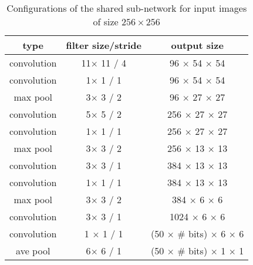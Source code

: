 \documentclass[10pt,twocolumn,letterpaper]{article}
\begin{document}
\begin{table}[t]
    \centering \caption{Configurations of the shared sub-network for input images of size $256\times 256$}
    \begin{tabular}{|c|c | c |}
        \hline{\bf type} &  {\bf filter size/stride} & {\bf output size} \\
        \hline
         convolution & 11$\times$ 11 / 4 & 96 $\times$ 54 $\times$ 54 \\
         \hline
         convolution &1$\times$ 1 / 1  & 96 $\times$ 54 $\times$ 54 \\
         \hline
         max pool & 3$\times$ 3 / 2  &96 $\times$ 27 $\times$ 27 \\
         \hline
         convolution & 5$\times$ 5 / 2  & 256 $\times$ 27 $\times$ 27 \\
         \hline
         convolution & 1$\times$ 1 / 1 & 256 $\times$ 27 $\times$ 27 \\
         \hline
         max pool & 3$\times$ 3 / 2 & 256 $\times$ 13 $\times$ 13 \\
         \hline
         convolution & 3$\times$ 3 / 1  & 384 $\times$ 13 $\times$ 13 \\
         \hline
         convolution & 1$\times$ 1 / 1 & 384 $\times$ 13 $\times$ 13 \\
         \hline
         max pool & 3$\times$ 3 / 2 & 384 $\times$ 6 $\times$ 6 \\
         \hline
         convolution & 3$\times$ 3 / 1   & 1024 $\times$ 6 $\times$ 6 \\
         \hline
         convolution & 1 $\times$ 1 / 1 & (50 $\times$ \# bits) $\times$ 6 $\times$ 6 \\
         \hline
         ave pool & 6$\times$ 6 / 1 &(50 $\times$ \# bits) $\times$ 1 $\times$ 1 \\
         \hline
        \end{tabular}
    \label{NIN_def}
\end{table}
\end{document}
